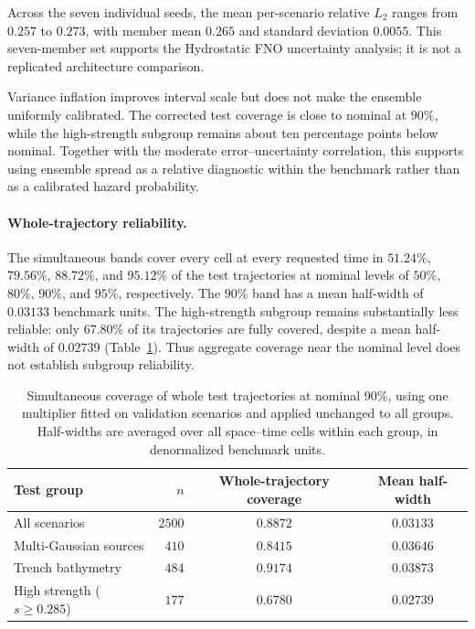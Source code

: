 Across the seven individual seeds, the mean per-scenario relative $L_2$ ranges from $0.257$ to $0.273$, with member mean $0.265$ and standard deviation $0.0055$. This seven-member set supports the Hydrostatic FNO uncertainty analysis; it is not a replicated architecture comparison.

Variance inflation improves interval scale but does not make the ensemble uniformly calibrated. The corrected test coverage is close to nominal at $90\%$, while the high-strength subgroup remains about ten percentage points below nominal. Together with the moderate error--uncertainty correlation, this supports using ensemble spread as a relative diagnostic within the benchmark rather than as a calibrated hazard probability.

\paragraph{Whole-trajectory reliability.}
The simultaneous bands cover every cell at every requested time in $51.24\%$, $79.56\%$, $88.72\%$, and $95.12\%$ of the test trajectories at nominal levels of $50\%$, $80\%$, $90\%$, and $95\%$, respectively. The $90\%$ band has a mean half-width of $0.03133$ benchmark units. The high-strength subgroup remains substantially less reliable: only $67.80\%$ of its trajectories are fully covered, despite a mean half-width of $0.02739$ (Table~\ref{tab:trajectory-coverage}). Thus aggregate coverage near the nominal level does not establish subgroup reliability.

\begin{table}[pos=!htbp]
\centering
\caption{Simultaneous coverage of whole test trajectories at nominal $90\%$, using one multiplier fitted on validation scenarios and applied unchanged to all groups. Half-widths are averaged over all space--time cells within each group, in denormalized benchmark units.}
\label{tab:trajectory-coverage}
\small
\begin{tabular}{lrcc}
    \toprule
    Test group & $n$ & Whole-trajectory coverage & Mean half-width \\
    \midrule
    All scenarios & $2500$ & $0.8872$ & $0.03133$ \\
    Multi-Gaussian sources & $410$ & $0.8415$ & $0.03646$ \\
    Trench bathymetry & $484$ & $0.9174$ & $0.03873$ \\
    High strength ($s\geq0.285$) & $177$ & $0.6780$ & $0.02739$ \\
    \bottomrule
\end{tabular}
\end{table}

